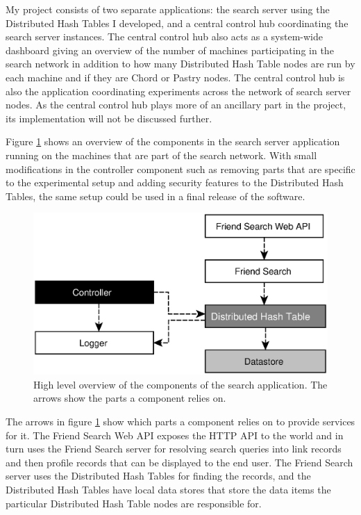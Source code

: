 \mbox{}

My project consists of two separate applications: the search server using the Distributed Hash Tables I developed, and a central control hub coordinating the search server instances.
The central control hub also acts as a system-wide dashboard giving an overview of the number of machines participating in the search network in addition to how many Distributed Hash Table nodes are run by each machine and if they are Chord or Pastry nodes. The central control hub is also the application coordinating experiments across the network of search server nodes.
As the central control hub plays more of an ancillary part in the project, its implementation will not be discussed further.

Figure \ref{figComponents} shows an overview of the components in the search server application running on the machines that are part of the search network. With small modifications in the controller component such as removing parts that are specific to the experimental setup and adding security features to the Distributed Hash Tables, the same setup could be used in a final release of the software.

\begin{figure}[!htb]
\begin{center}
	\includegraphics[width=0.9\linewidth]{illustrations/ComponentOverview.eps}
\caption{High level overview of the components of the search application. The arrows show the parts a component relies on.}
\label{figComponents}
\end{center}
\end{figure}

The arrows in figure \ref{figComponents} show which parts a component relies on to provide services for it. The Friend Search Web API exposes the HTTP API to the world and in turn uses the Friend Search server for resolving search queries into link records and then profile records that can be displayed to the end user. The Friend Search server uses the Distributed Hash Tables for finding the records, and the Distributed Hash Tables have local data stores that store the data items the particular Distributed Hash Table nodes are responsible for.

